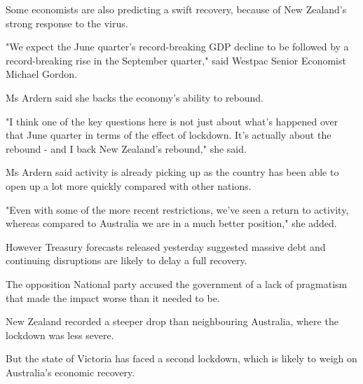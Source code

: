 \documentclass[a4paper,12pt]{article}
\begin{document}
Some economists are also predicting a swift recovery, because of New Zealand's strong response to the virus.

"We expect the June quarter's record-breaking GDP decline to be followed by a record-breaking rise in the September quarter," said Westpac Senior Economist Michael Gordon.

Ms Ardern said she backs the economy's ability to rebound.

"I think one of the key questions here is not just about what's happened over that June quarter in terms of the effect of lockdown. It's actually about the rebound - and I back New Zealand's rebound," she said.

Ms Ardern said activity is already picking up as the country has been able to open up a lot more quickly compared with other nations.

"Even with some of the more recent restrictions, we've seen a return to activity, whereas compared to Australia we are in a much better position," she added.

However Treasury forecasts released yesterday suggested massive debt and continuing disruptions are likely to delay a full recovery.

The opposition National party accused the government of a lack of pragmatism that made the impact worse than it needed to be.

New Zealand recorded a steeper drop than neighbouring Australia, where the lockdown was less severe.

But the state of Victoria has faced a second lockdown, which is likely to weigh on Australia's economic recovery.

\newpage







\end{document}
